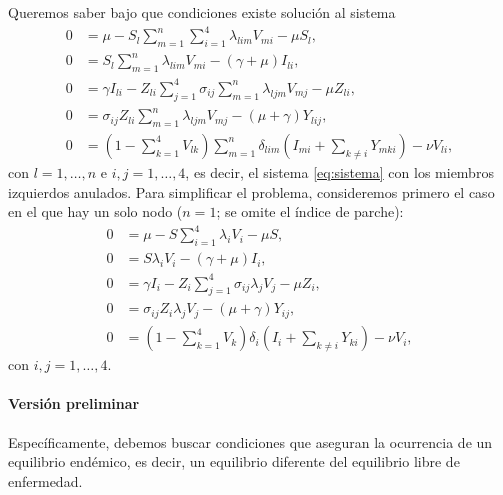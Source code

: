 \documentclass{article}
\numberwithin{equation}{section}
\begin{document}
Queremos saber bajo que condiciones existe solución al sistema 
\begin{align*}
    0 & =\mu-S_l\sum_{m=1}^n\sum_{i=1}^4 \lambda_{lim} V_{mi} -\mu S_l, \\
    0 & =S_l\sum_{m=1}^n\lambda_{lim} V_{mi} -\left(\gamma+\mu\right) I_{li}, \\
    0 & =\gamma I_{li}-Z_{li}\sum_{j=1}^4\sigma_{ij}\sum_{m=1}^n  \lambda_{ljm}V_{mj}-\mu Z_{li}, \\
    0 & =\sigma_{ij}Z_{li}\sum_{m=1}^n\lambda_{ljm}V_{mj}-\left(\mu+\gamma\right) Y_{lij}, \\
    0 & =\left(1-\sum_{k=1}^4 V_{lk}\right)\sum_{m=1}^n\delta_{lim}\left(I_{mi}+\sum_{k\neq i} Y_{mki}\right)-\nu V_{li},
\end{align*}
con $l=1,\dots,n$ e $i,j=1,\dots,4$, es decir, el sistema \eqref{eq:sistema} con los miembros izquierdos anulados.
Para simplificar el problema, consideremos primero el caso en el que hay un solo nodo ($n=1$; se omite el índice de parche):
\begin{align*}
    0 & =\mu-S\sum_{i=1}^4 \lambda_{i} V_{i} -\mu S, \\
    0 & =S\lambda_{i} V_{i} -\left(\gamma+\mu\right) I_{i}, \\
    0 & =\gamma I_{i}-Z_{i}\sum_{j=1}^4\sigma_{ij}  \lambda_{j}V_{j}-\mu Z_{i}, \\
    0 & =\sigma_{ij}Z_{i}\lambda_{j}V_{j}-\left(\mu+\gamma\right) Y_{ij}, \\
    0 & =\left(1-\sum_{k=1}^4 V_{k}\right)\delta_{i}\left(I_{i}+\sum_{k\neq i} Y_{ki}\right)-\nu V_{i},
\end{align*}
con $i,j=1,\dots,4$.

\paragraph{Versión preliminar}
Específicamente, debemos buscar condiciones que aseguran la ocurrencia de un equilibrio endémico, es decir, un equilibrio diferente del equilibrio libre de enfermedad. 
\end{document}

